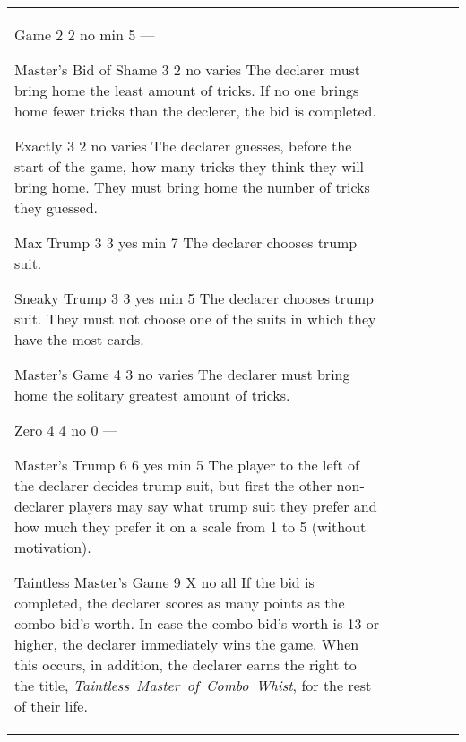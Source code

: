 \begin{table}
\begin{center}
\begin{tabularx}{\textwidth}{
			l
			S[table-number-alignment=center, table-format=1.0]
			S[table-number-alignment=center, table-format=1.0]
			cc|X
		}
				\standardBidItem%
				{Game}
				{2}
				{2}
				{no}
				{min 5}
				{%
					---
				}

				\standardBidItem%
				{Master's Bid of Shame}
				{3}
				{2}
				{no}
				{varies}
				{%
					The declarer must bring home the least amount of tricks. If no one brings home fewer tricks than the declerer, the bid is completed.
				}

				\standardBidItem%
				{Exactly}
				{3}
				{2}
				{no}
				{varies}
				{%
					The declarer guesses, before the start of the game, how many tricks they think they will bring home. They must bring home the number of tricks they guessed.
				}

				\standardBidItem%
				{Max Trump}
				{3}
				{3}
				{yes}
				{min 7}
				{%
					The declarer chooses trump suit.
				}

				\standardBidItem%
				{Sneaky Trump}
				{3}
				{3}
				{yes}
				{min 5}
				{%
					The declarer chooses trump suit. They must not choose one of the suits in which they have the most cards.
				}

				\standardBidItem%
				{Master's Game}
				{4}
				{3}
				{no}
				{varies}
				{%
					The declarer must bring home the solitary greatest amount of tricks.
				}

				\standardBidItem%
				{Zero}
				{4}
				{4}
				{no}
				{0}
				{%
					---
				}

				\standardBidItem%
				{Master's Trump}
				{6}
				{6}
				{yes}
				{min 5}
				{%
					The player to the left of the declarer decides trump suit, but first the other non-declarer players may say what trump suit they prefer and how much they prefer it on a scale from 1 to 5 (without motivation).
				}

				\standardBidItem%
				{Taintless Master's Game}
				{9}
				{X}
				{no}
				{all}
				{%
					If the bid is completed, the declarer scores as many points as the combo bid's worth. In case the combo bid's worth is 13 or higher, the declarer immediately wins the game. When this occurs, in addition, the declarer earns the right to the title, \emph{Taintless~Master~of~Combo~Whist}, for the rest of their life.
				}
		\end{tabularx}
	\end{center}
\end{table}
